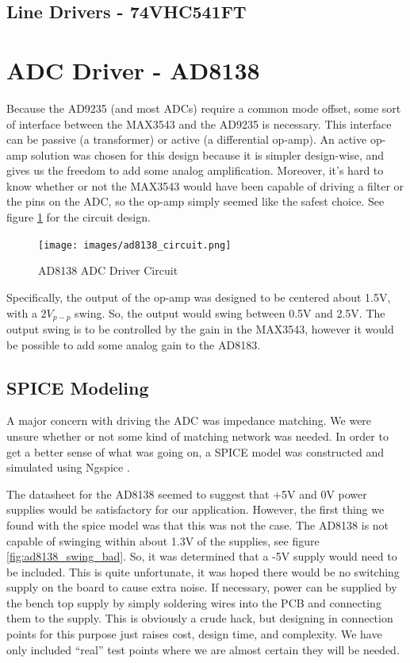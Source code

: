 \documentclass[a4paper, 12pt, notitlepage]{article}
\begin{document}
\subsection{Line Drivers - 74VHC541FT}

\section{ADC Driver - AD8138}
Because the AD9235 (and most ADCs) require a common mode offset, some sort of interface between the MAX3543 and the AD9235 is necessary.  This interface can be passive (a transformer) or active (a differential op-amp).  An active op-amp solution was chosen for this design because it is simpler design-wise, and gives us the freedom to add some analog amplification.  Moreover, it's hard to know whether or not the MAX3543 would have been capable of driving a filter or the pins on the ADC, so the op-amp simply seemed like the safest choice.  See figure \ref{fig:ad8138_circuit} for the circuit design.

\begin{figure}[ht]
  \centering
  \caption{AD8138 ADC Driver Circuit}
  \label{fig:ad8138_circuit}
  \texttt{[image: images/ad8138\_circuit.png]}
\end{figure}

Specifically, the output of the op-amp was designed to be centered about 1.5V, with a $2V_{p-p}$ swing.  So, the output would swing between 0.5V and 2.5V.  The output swing is to be controlled by the gain in the MAX3543, however it would be possible to add some analog gain to the AD8183.

\subsection{SPICE Modeling}
A major concern with driving the ADC was impedance matching.  We were unsure whether or not some kind of matching network was needed.  In order to get a better sense of what was going on, a SPICE model was constructed and simulated using Ngspice \cite{ngspice}.

The datasheet for the AD8138 seemed to suggest that +5V and 0V power supplies would be satisfactory for our application.  However, the first thing we found with the spice model was that this was not the case.  The AD8138 is not capable of swinging within about 1.3V of the supplies, see figure \ref{fig:ad8138_swing_bad}.  So, it was determined that a -5V supply would need to be included.  This is quite unfortunate, it was hoped there would be no switching supply on the board to cause extra noise.  If necessary, power can be supplied by the bench top supply by simply soldering wires into the PCB and connecting them to the supply.  This is obviously a crude hack, but designing in connection points for this purpose just raises cost, design time, and complexity.  We have only included ``real'' test points where we are almost certain they will be needed.
\end{document}
